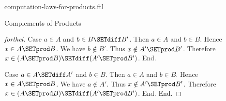 \documentclass{naproche-library}
\begin{document}
\begin{smodule}[title=Computation Laws for Cartesian Products]{computation-laws-for-products.ftl}
\begin{sfragment}{Complements of Products}
\begin{proof}[forthel]
      Case $a \in A$ and $b \in B \SETdiff B'$.
        Then $a \in A$ and $b \in B$.
        Hence $x \in A \SETprod B$.
        We have $b \notin B'$.
        Thus $x \notin A' \SETprod B'$.
        Therefore $x \in (A \SETprod B) \SETdiff (A' \SETprod B')$.
      End.

      Case $a \in A \SETdiff A'$ and $b \in B$.
        Then $a \in A$ and $b \in B$.
        Hence $x \in A \SETprod B$.
        We have $a \notin A'$.
        Thus $x \notin A' \SETprod B'$.
        Therefore $x \in (A \SETprod B) \SETdiff (A' \SETprod B')$.
      End.
    End.
  \end{proof}
\end{sfragment}
\end{smodule}
\end{document}
